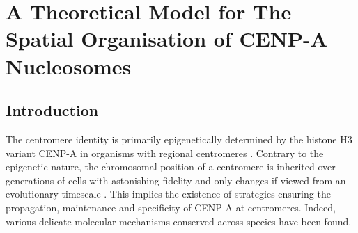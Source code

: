 \chapter{A Theoretical Model for The Spatial Organisation of CENP-A Nucleosomes}
\label{chapter 2}
\section{Introduction}

The centromere identity is primarily epigenetically determined by the histone H3 variant CENP-A in organisms with regional centromeres \citep{Warburton1997ImmunolocalizationCentromeres, Vafa1997ChromatinPlate, Earnshaw1985ThreeChromosome, Liu2006MappingCells, Regnier2005CENP-ABubR1, Heun2006, Mendiburo2011, Barnhart2011, Logsdon2015, Logsdon2019}. Contrary to the epigenetic nature, the chromosomal position of a centromere is inherited over generations of cells with astonishing fidelity and only changes if viewed from an evolutionary timescale \citep{Amor2004HumanProgress, Murphy2005DynamicsMaps}. This implies the existence of strategies ensuring the propagation, maintenance and specificity of CENP-A at centromeres. Indeed, various delicate molecular mechanisms conserved across species have been found. 

